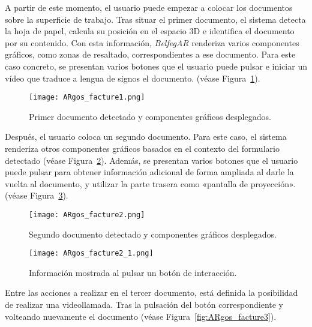 A partir de este momento, el usuario puede empezar a colocar los documentos sobre la superficie de trabajo. Tras situar el primer documento, el sistema detecta la hoja de papel, calcula su posición en el espacio 3D e identifica el documento por su contenido. Con esta información, \textit{BelfegAR} renderiza varios componentes gráficos, como zonas de resaltado, correspondientes a ese documento. Para este caso concreto, se presentan varios botones que el usuario puede pulsar e iniciar un vídeo que traduce a lengua de signos el documento. (véase Figura~\ref{fig:ARgos_facture1}).

\begin{figure}
  \begin{center}
    \texttt{[image: ARgos\_facture1.png]}
    \caption{Primer documento detectado y componentes gráficos desplegados.}
    \label{fig:ARgos_facture1}
  \end{center}
\end{figure}

Después, el usuario coloca un segundo documento. Para este caso, el sistema renderiza otros componentes gráficos basados en el contexto del formulario detectado (véase Figura~\ref{fig:ARgos_facture2}). Además, se presentan varios botones que el usuario puede pulsar para obtener información adicional de forma ampliada al darle la vuelta al documento, y utilizar la parte trasera como «pantalla de proyección». (véase Figura~\ref{fig:ARgos_facture2_1}).

\begin{figure}
  \begin{center}
    \texttt{[image: ARgos\_facture2.png]}
    \caption{Segundo documento detectado y componentes gráficos desplegados.}
    \label{fig:ARgos_facture2}
  \end{center}
\end{figure}

\begin{figure}
  \begin{center}
    \texttt{[image: ARgos\_facture2\_1.png]}
    \caption{Información mostrada al pulsar un botón de interacción.}
    \label{fig:ARgos_facture2_1}
  \end{center}
\end{figure}

Entre las acciones a realizar en el tercer documento, está definida la posibilidad de realizar una videollamada. Tras la pulsación del botón correspondiente y volteando nuevamente el documento (véase Figura~\ref{fig:ARgos_facture3}). 

